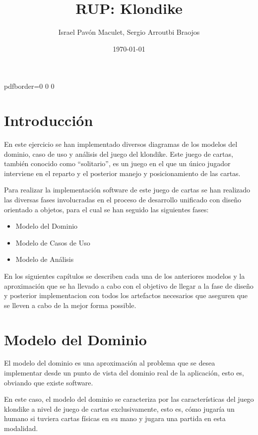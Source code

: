 \documentclass[11pt]{article}
\title{\textbf{RUP: Klondike}}
\author{Israel Pavón Maculet,
Sergio Arroutbi Braojos}
\date{\today}
\begin{document}
\hypersetup
{   
pdfborder={0 0 0}
}
   
\maketitle

\pagebreak

\tableofcontents

\pagebreak

\section{Introducción}
En este ejercicio se han implementado diversos diagramas de los modelos del dominio, caso de uso y análisis del juego del klondike. Este juego de cartas, también conocido como ``solitario'', es un juego en el que un único jugador interviene en el reparto y el posterior manejo y posicionamiento de las cartas.

Para realizar la implementación software de este juego de cartas se han realizado las diversas fases involucradas en el proceso de desarrollo unificado con diseño orientado a objetos, para el cual se han seguido las siguientes fases:

\begin{itemize}\itemsep0pt
\item{Modelo del Dominio}
\item{Modelo de Casos de Uso}
\item{Modelo de Análisis}
\end{itemize}

En los siguientes capítulos se describen cada una de los anteriores modelos y la aproximación que se ha llevado a cabo con el objetivo de llegar a la fase de diseño y posterior implementacion con todos los artefactos necesarios que aseguren que se lleven a cabo de la mejor forma possible.

\pagebreak

\section{Modelo del Dominio}

El modelo del dominio es una aproximación al problema que se desea implementar desde un punto de vista del dominio real de la aplicación, esto es, obviando que existe software.

En este caso, el modelo del dominio se caracteriza por las características del juego klondike a nivel de juego de cartas exclusivamente, esto es, cómo jugaría un humano si tuviera cartas físicas en su mano y jugara una partida en esta modalidad. 
\end{document}
